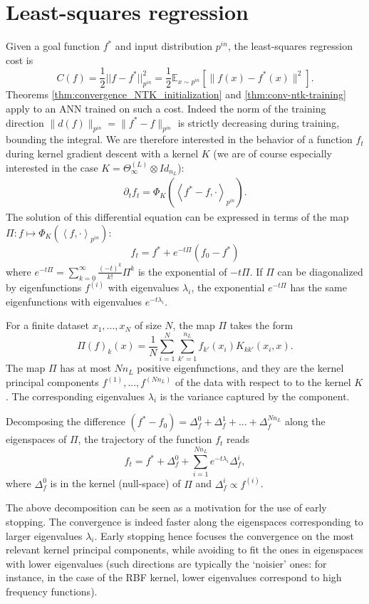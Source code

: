 \documentclass{article}
\begin{document}
\section{Least-squares regression}\label{sec:least-squares}
Given a goal function $f^*$ and input distribution $p^{in}$, the least-squares regression cost is
$$
 C(f) = \frac{1}{2} ||f - f^*||^2_{p^{in}} = \frac{1}{2}\mathbb{E}_{x \sim p^{in}} \left[\|f(x) - f^*(x)\|^2 \right].
$$
Theorems  \ref{thm:convergence_NTK_initialization} and \ref{thm:conv-ntk-training} apply to an ANN trained on such a cost. Indeed the norm of the training direction $\|d(f)\|_{p^{in}} = \| f^* - f \|_{p^{in}}$ is strictly decreasing during training, bounding the integral. We are therefore interested in the behavior of a function $f_t$ during kernel gradient descent with a kernel $K$ (we are of course especially interested in the case $K = \Theta^{(L)}_\infty \otimes Id_{n_L}$):
\begin{align*}
    \partial_t f_t = \Phi_K\left(\left<f^* - f, \cdot \right>_{p^{in}}\right).
\end{align*}
The solution of this differential equation can be expressed in terms of the map $\Pi : f \mapsto \Phi_K \left(\left<f, \cdot \right>_{p^{in}}\right)$:
$$
 f_t = f^* + e^{-t \Pi}(f_0 - f^*)
$$
where $e^{-t \Pi} = \sum_{k=0}^{\infty} \frac{(-t)^k}{k!} \Pi^k$ is the exponential of $-t \Pi$. If $\Pi$ can be diagonalized by eigenfunctions $f^{(i)}$ with eigenvalues $\lambda_i$, the exponential $e^{-t \Pi}$ has the same eigenfunctions with eigenvalues $e^{-t \lambda_i}$.

For a finite dataset $x_1, ..., x_N$ of size $N$, the map $\Pi$ takes the form
$$
\Pi(f)_k (x) = \frac{1}{N} \sum_{i=1}^N \sum_{k'=1}^{n_L} f_{k'}(x_i) K_{kk'}(x_i, x).
$$
The map $\Pi$ has at most $Nn_L$ positive eigenfunctions, and they are the kernel principal components $f^{(1)}, ..., f^{(N n_L)}$ of the data with respect to to the kernel $K$ \cite{Scholkopf, Shawe-Taylor}. The corresponding eigenvalues $\lambda_i$ is the variance captured by the component.

Decomposing the difference $(f^* - f_0) = \Delta^0_f + \Delta^1_f + ... + \Delta^{N n_L}_f$ along the eigenspaces of $\Pi$, the trajectory of the function $f_t$ reads
$$
 f_{t} = f^* + \Delta^0_f + \sum_{i=1}^{N n_L} e^{-t \lambda_i} \Delta^i_f,
$$
where $\Delta^0_f$ is in the kernel (null-space) of $\Pi$ and $\Delta^i_f \propto f^{(i)}$. 

The above decomposition can be seen as a motivation for the use of early stopping. The convergence is indeed faster along the eigenspaces corresponding to larger eigenvalues $\lambda_i$. Early stopping hence focuses the convergence on the most relevant kernel principal components, while avoiding to fit the ones in eigenspaces with lower eigenvalues (such directions are typically the `noisier' ones: for instance, in the case of the RBF kernel, lower eigenvalues correspond to high frequency functions).
\end{document}
